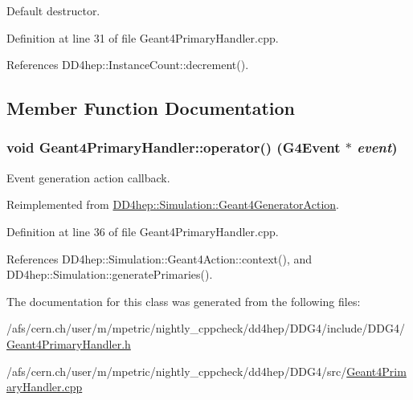 Default destructor. 

Definition at line 31 of file Geant4PrimaryHandler.cpp.

References DD4hep::InstanceCount::decrement().

\subsection{Member Function Documentation}
\hypertarget{class_d_d4hep_1_1_simulation_1_1_geant4_primary_handler_a54370e4749de14a101a248981f51864b}{
\subsubsection[{operator()}]{\setlength{\rightskip}{0pt plus 5cm}void Geant4PrimaryHandler::operator() (G4Event $\ast$ {\em event})}}
\label{class_d_d4hep_1_1_simulation_1_1_geant4_primary_handler_a54370e4749de14a101a248981f51864b}


Event generation action callback. 

Reimplemented from \hyperlink{class_d_d4hep_1_1_simulation_1_1_geant4_generator_action_ac5a1d2335a19e3f9d555081199e01801}{DD4hep::Simulation::Geant4GeneratorAction}.

Definition at line 36 of file Geant4PrimaryHandler.cpp.

References DD4hep::Simulation::Geant4Action::context(), and DD4hep::Simulation::generatePrimaries().

The documentation for this class was generated from the following files:\begin{DoxyCompactItemize}
\item 
/afs/cern.ch/user/m/mpetric/nightly\_\-cppcheck/dd4hep/DDG4/include/DDG4/\hyperlink{_geant4_primary_handler_8h}{Geant4PrimaryHandler.h}\item 
/afs/cern.ch/user/m/mpetric/nightly\_\-cppcheck/dd4hep/DDG4/src/\hyperlink{_geant4_primary_handler_8cpp}{Geant4PrimaryHandler.cpp}\end{DoxyCompactItemize}
